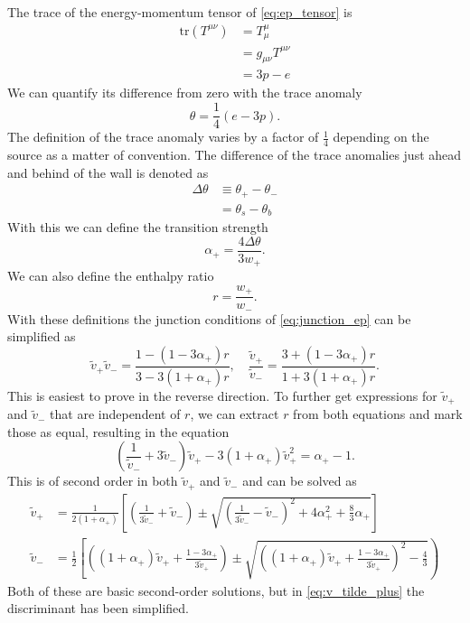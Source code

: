 The trace of the energy-momentum tensor of \eqref{eq:ep_tensor} is
\begin{align}
\text{tr} (T^{\mu \nu})
&= T^\mu_\mu \\
&= g_{\mu \nu} T^{\mu \nu} \\
&=3p - e
\end{align}
We can quantify its difference from zero with the trace anomaly
\cites[eq. 7.24]{lecture_notes}[eq. 28]{giese_2020}
\begin{equation}
\theta = \frac{1}{4}(e-3p).
\end{equation}
The definition of the trace anomaly varies by a factor of $\frac{1}{4}$ depending on the source as a matter of convention.
The difference of the trace anomalies just ahead and behind of the wall is denoted as
\begin{align}
\Delta \theta
&\equiv \theta_+ - \theta_- \\
&= \theta_s - \theta_b
\end{align}
With this we can define the transition strength
\begin{equation}
\alpha_+ = \frac{4 \Delta \theta}{3 w_+}.
\end{equation}
We can also define the enthalpy ratio
\begin{equation}
r = \frac{w_+}{w_-}.
\end{equation}
With these definitions the junction conditions of \eqref{eq:junction_ep} can be simplified as
\begin{equation}
\tilde{v}_+ \tilde{v}_- = \frac{1-(1-3\alpha_+)r}{3-3(1+\alpha_+)r},
\quad
\frac{\tilde{v}_+}{\tilde{v}_-} = \frac{3+(1-3\alpha_+)r}{1+3(1+\alpha_+)r}.
\end{equation}
This is easiest to prove in the reverse direction.
To further get expressions for $\tilde{v}_+$ and $\tilde{v}_-$ that are independent of $r$, we can extract $r$ from both equations and mark those as equal, resulting in the equation
\begin{equation}
\left( \frac{1}{\tilde{v}_-} + 3 \tilde{v}_- \right) \tilde{v}_+ - 3(1+\alpha_+)\tilde{v}_+^2 = \alpha_+ - 1.
\end{equation}
This is of second order in both $\tilde{v}_+$ and $\tilde{v}_-$ and can be solved as \cite[eq. B.6, B.7]{hindmarsh_gw_pt_2019}
\begin{align}
\tilde{v}_+ &= \frac{1}{2(1+\alpha_+)}\left[ \left(\frac{1}{3\tilde{v}_-}+\tilde{v}_-\right) \pm \sqrt{\left(\frac{1}{3\tilde{v}_-} - \tilde{v}_- \right)^2 + 4\alpha_+^2 + \frac{8}{3} \alpha_+} \right]
\label{eq:v_tilde_plus}
\\
\tilde{v}_- &= \frac{1}{2} \left[ \left( (1+\alpha_+)\tilde{v}_+ + \frac{1-3\alpha_+}{3\tilde{v}_+} \right) \pm \sqrt{\left((1+\alpha_+)\tilde{v}_+ + \frac{1-3\alpha_+}{3\tilde{v}_+} \right)^2 - \frac{4}{3}} \right)
\label{eq:v_tilde_minus}
\end{align}
Both of these are basic second-order solutions, but in \eqref{eq:v_tilde_plus} the discriminant has been simplified.



